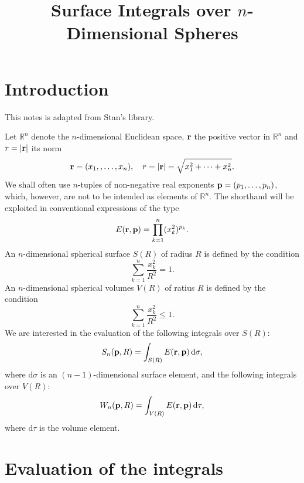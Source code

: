 \documentclass[11pt, letterpaper]{article}
\theoremstyle{plain}
\theoremstyle{definition}
\theoremstyle{remark}
\begin{document}
\title{Surface Integrals over $n$-Dimensional Spheres}
\maketitle

\section{Introduction}
This notes is adapted from Stan's library.

Let $\mathbb{R}^n$ denote the $n$-dimensional Euclidean space, $\mathbf{r}$ the positive vector in $\mathbb{R}^n$ and $r=|\mathbf{r}|$ its norm
$$
\mathbf{r}=(x_1,,\ldots,x_n), \quad r=|\mathbf{r}|=\sqrt{x_1^2+\cdots+x_n^2}.
$$
We shall often use $n$-tuples of non-negative real exponents
$
\mathbf{p}=(p_1,\ldots,p_n)
$, which, however, are not to be intended as elements of $\mathbb{R}^n$.
The shorthand will be exploited in conventional expressions of the type
$$E(\mathbf{r},\mathbf{p})=\prod_{k=1}^n (x_k^2)^{p_k}.$$
An $n$-dimensional spherical surface $S(R)$ of radius $R$ is defined by the condition
$$
\sum_{k=1}^n \frac{x_k^2}{R^2}=1.
$$
An $n$-dimensional spherical volumes $V(R)$ of ratius $R$ is defined by the condition
$$
\sum_{k=1}^n \frac{x_k^2}{R^2}\leq 1.
$$
We are interested in the evaluation of the following integrals over $S(R)$:
\begin{equation}\label{eq:1}
S_n(\mathbf{p},R)=\int_{S(R)}E(\mathbf{r},\mathbf{p})\, \mathrm{d} \sigma,
\end{equation}
where $\mathrm{d}\sigma$ is an $(n-1)$-dimensional surface element, and the following integrals over $V(R)$:
$$
W_n(\mathbf{p},R)=\int_{V(R)}E(\mathbf{r},\mathbf{p})\, \mathrm{d} \tau,
$$
where $\mathrm{d}\tau$ is  the volume element.
\section{Evaluation of the integrals}
\end{document}
